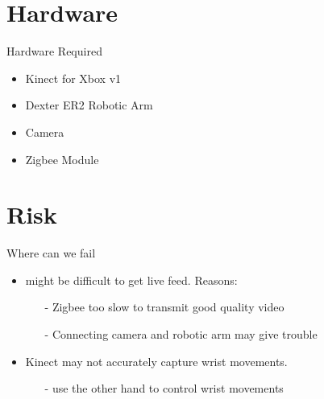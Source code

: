 \documentclass{beamer}
\begin{document}
\section{Hardware}
\begin{frame}{Hardware Required}
\begin{itemize}
\item Kinect for Xbox v1
\item Dexter ER2 Robotic Arm
\item Camera
\item Zigbee Module
\end{itemize}
\end{frame}
\section{Risk}
\begin{frame}{Where can we fail}
\begin{itemize}
\item might be difficult to get live feed. Reasons:
\begin{itemize}
\item[-]Zigbee too slow to transmit good quality video
\item[-]Connecting camera and robotic arm may give trouble
\end{itemize}
\item Kinect may not accurately capture wrist movements.
\begin{itemize}
\item[-]use the other hand to control wrist movements
\end{itemize}
\end{itemize}
\end{frame}
\end{document}
